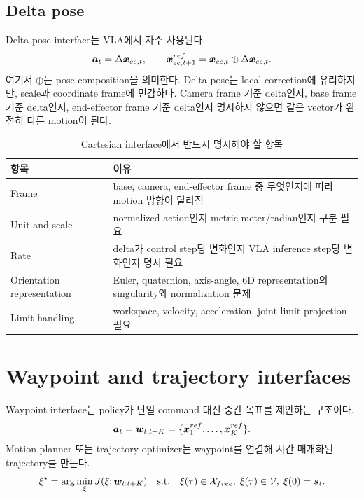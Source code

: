 \subsection{Delta pose}

Delta pose interface는 VLA에서 자주 사용된다.
\begin{equation}
  \bm{a}_t = \Delta \bm{x}_{ee,t},
  \qquad
  \bm{x}^{ref}_{ee,t+1} = \bm{x}_{ee,t}\oplus \Delta \bm{x}_{ee,t}.
  \label{eq:delta-pose}
\end{equation}
여기서 $\oplus$는 pose composition을 의미한다. Delta pose는 local correction에 유리하지만, scale과 coordinate frame에 민감하다. Camera frame 기준 delta인지, base frame 기준 delta인지, end-effector frame 기준 delta인지 명시하지 않으면 같은 vector가 완전히 다른 motion이 된다.

\begin{table}[ht]
\centering
\caption{Cartesian interface에서 반드시 명시해야 할 항목}
\label{tab:cartesian-contract}
\small
\begin{tabularx}{\textwidth}{p{32mm}X}
\toprule
항목 & 이유 \\
\midrule
Frame & base, camera, end-effector frame 중 무엇인지에 따라 motion 방향이 달라짐 \\
Unit and scale & normalized action인지 metric meter/radian인지 구분 필요 \\
Rate & delta가 control step당 변화인지 VLA inference step당 변화인지 명시 필요 \\
Orientation representation & Euler, quaternion, axis-angle, 6D representation의 singularity와 normalization 문제 \\
Limit handling & workspace, velocity, acceleration, joint limit projection 필요 \\
\bottomrule
\end{tabularx}
\end{table}

\section{Waypoint and trajectory interfaces}

Waypoint interface는 policy가 단일 command 대신 중간 목표를 제안하는 구조이다.
\begin{equation}
  \bm{a}_t = \bm{w}_{t:t+K}
  =
  \{\bm{x}^{ref}_{1},\ldots,\bm{x}^{ref}_{K}\}.
  \label{eq:waypoint-sequence}
\end{equation}
Motion planner 또는 trajectory optimizer는 waypoint를 연결해 시간 매개화된 trajectory를 만든다.
\begin{equation}
  \xi^\star
  =
  \arg\min_{\xi}
  J(\xi;\bm{w}_{t:t+K})
  \quad
  \text{s.t.}\quad
  \xi(\tau)\in\mathcal{X}_{free},\;
  \dot{\xi}(\tau)\in\mathcal{V},\;
  \xi(0)=\bm{s}_t.
  \label{eq:trajectory-optimization}
\end{equation}

